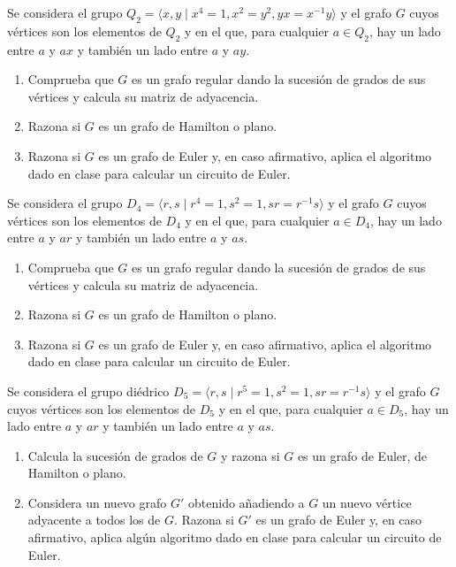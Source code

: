 \begin{ejercicio}\label{ej:1.33}
    Se considera el grupo $Q_2 = \langle x, y \mid x^4 = 1, x^2 = y^2, yx = x^{-1}y \rangle$ y el grafo $G$ cuyos vértices son los elementos de $Q_2$ y en el que, para cualquier $a \in Q_2$, hay un lado entre $a$ y $ax$ y también un lado entre $a$ y $ay$.
    \begin{enumerate}
        \item Comprueba que $G$ es un grafo regular dando la sucesión de grados de sus vértices y calcula su matriz de adyacencia.
        \item Razona si $G$ es un grafo de Hamilton o plano.
        \item Razona si $G$ es un grafo de Euler y, en caso afirmativo, aplica el algoritmo dado en clase para calcular un circuito de Euler.
    \end{enumerate}
\end{ejercicio}

\begin{ejercicio}\label{ej:1.34}
    Se considera el grupo $D_4 = \langle r, s \mid r^4 = 1, s^2 = 1, sr = r^{-1}s \rangle$ y el grafo $G$ cuyos vértices son los elementos de $D_4$ y en el que, para cualquier $a \in D_4$, hay un lado entre $a$ y $ar$ y también un lado entre $a$ y $as$.
    \begin{enumerate}
        \item Comprueba que $G$ es un grafo regular dando la sucesión de grados de sus vértices y calcula su matriz de adyacencia.
        \item Razona si $G$ es un grafo de Hamilton o plano.
        \item Razona si $G$ es un grafo de Euler y, en caso afirmativo, aplica el algoritmo dado en clase para calcular un circuito de Euler.
    \end{enumerate}
\end{ejercicio}


\begin{ejercicio}\label{ej:1.35}
    Se considera el grupo diédrico $D_5 = \langle r, s \mid r^5 = 1, s^2 = 1, sr = r^{-1}s \rangle$ y el grafo $G$ cuyos vértices son los elementos de $D_5$ y en el que, para cualquier $a \in D_5$, hay un lado entre $a$ y $ar$ y también un lado entre $a$ y $as$.
    \begin{enumerate}
        \item Calcula la sucesión de grados de $G$ y razona si $G$ es un grafo de Euler, de Hamilton o plano.
        \item Considera un nuevo grafo $G'$ obtenido añadiendo a $G$ un nuevo vértice adyacente a todos los de $G$. Razona si $G'$ es un grafo de Euler y, en caso afirmativo, aplica algún algoritmo dado en clase para calcular un circuito de Euler.
    \end{enumerate}
\end{ejercicio}

